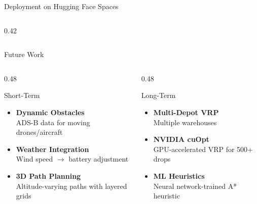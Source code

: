 \documentclass[aspectratio=169, 11pt]{beamer}
\begin{document}
\begin{frame}{Deployment on Hugging Face Spaces}
\begin{columns}[T]
\begin{column}{0.42\textwidth}
\end{column}
\end{columns}
\end{frame}

\begin{frame}{Future Work}
\begin{columns}[T]
\begin{column}{0.48\textwidth}
\begin{block}{Short-Term}
\begin{itemize}\small
    \item[\textcolor{neongreen}{1.}] \textbf{Dynamic Obstacles}\\ADS-B data for moving drones/aircraft
    \item[\textcolor{neongreen}{2.}] \textbf{Weather Integration}\\Wind speed $\rightarrow$ battery adjustment
    \item[\textcolor{neongreen}{3.}] \textbf{3D Path Planning}\\Altitude-varying paths with layered grids
\end{itemize}
\end{block}
\end{column}
\begin{column}{0.48\textwidth}
\begin{block}{Long-Term}
\begin{itemize}\small
    \item[\textcolor{accentblue}{4.}] \textbf{Multi-Depot VRP}\\Multiple warehouses
    \item[\textcolor{accentblue}{5.}] \textbf{NVIDIA cuOpt}\\GPU-accelerated VRP for 500+ drops
    \item[\textcolor{accentblue}{6.}] \textbf{ML Heuristics}\\Neural network-trained A* heuristic
\end{itemize}
\end{block}
\end{column}
\end{columns}
\end{frame}
\end{document}
